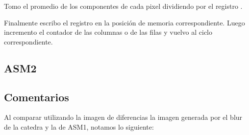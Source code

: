 Tomo el promedio de los componentes de cada pixel dividiendo por el registro .


Finalmente escribo el registro en la posición de memoria correspondiente. Luego incremento el contador de las columnas o de las filas y vuelvo al ciclo correspondiente.

\pagebreak

\subsection{ASM2}

\pagebreak

\subsection{Comentarios}
Al comparar utilizando la imagen de diferencias la imagen generada por el blur de la catedra y la de ASM1, notamos lo siguiente:

